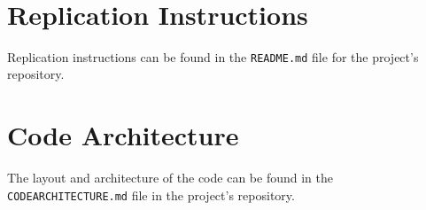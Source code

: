 \documentclass[10pt,twocolumn]{article}
\begin{document}
‌

 
\appendix

\section{Replication Instructions}

Replication instructions can be found in the \verb|README.md| file for the project's repository.

\section{Code Architecture}

The layout and architecture of the code can be found in the
\verb|CODEARCHITECTURE.md| file in the project's repository.
\printbibliography
\end{document}
